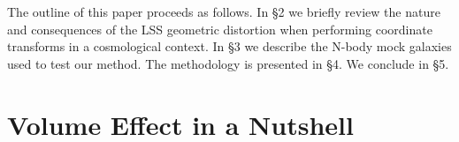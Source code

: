 \documentclass[iop]{emulateapj}
\begin{document}

The outline of this paper proceeds as follows. 
In \S 2 we briefly review the nature and consequences of the LSS geometric distortion when performing coordinate transforms in a cosmological context. 
In \S 3 we describe the N-body mock galaxies used to test our method.
The methodology is presented in \S 4.
We conclude in \S 5.



\section{Volume Effect in a Nutshell}
\label{sec:Voleffect}
\end{document}
